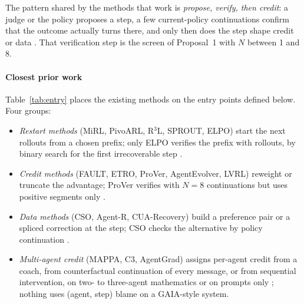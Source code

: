 \documentclass[10pt,a4paper]{article}
\begin{document}
The pattern shared by the methods that work is \emph{propose, verify, then credit}: a judge or the policy proposes a step, a few current-policy continuations confirm that the outcome actually turns there, and only then does the step shape credit or data \cite{liang2026elpo,jung2026prover,li2026cso,chu2026agentgrad}. That verification step is the screen of Proposal~1 with $N$ between 1 and 8.

\paragraph{Closest prior work} Table~\ref{tab:entry} places the existing methods on the entry points defined below. Four groups:
\begin{itemize}[leftmargin=1.1em]
\item \emph{Restart methods} (MiRL, PivoARL, R$^3$L, SPROUT, ELPO) start the next rollouts from a chosen prefix; only ELPO verifies the prefix with rollouts, by binary search for the first irrecoverable step \cite{liang2026elpo}.
\item \emph{Credit methods} (FAULT, ETRO, ProVer, AgentEvolver, LVRL) reweight or truncate the advantage; ProVer verifies with $N=8$ continuations but uses positive segments only \cite{jung2026prover}.
\item \emph{Data methods} (CSO, Agent-R, CUA-Recovery) build a preference pair or a spliced correction at the step; CSO checks the alternative by policy continuation \cite{li2026cso}.
\item \emph{Multi-agent credit} (MAPPA, C3, AgentGrad) assigns per-agent credit from a coach, from counterfactual continuation of every message, or from sequential intervention, on two- to three-agent mathematics or on prompts only \cite{li2026mappa,chen2026c3,chu2026agentgrad}; nothing uses (agent, step) blame on a GAIA-style system.
\end{itemize}
\end{document}
